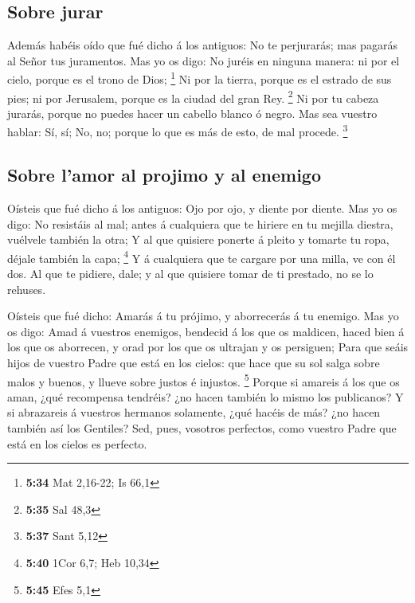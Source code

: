 \hypertarget{sobre-jurar}{%
\subsection{Sobre jurar}\label{sobre-jurar}}

 Además habéis oído que fué dicho á los antiguos: No te
perjurarás; mas pagarás al Señor tus juramentos.  Mas yo os
digo: No juréis en ninguna manera: ni por el cielo, porque es el trono
de Dios; \footnote{\textbf{5:34} Mat 2,16-22; Is 66,1}  Ni
por la tierra, porque es el estrado de sus pies; ni por Jerusalem,
porque es la ciudad del gran Rey. \footnote{\textbf{5:35} Sal 48,3}
 Ni por tu cabeza jurarás, porque no puedes hacer un
cabello blanco ó negro.  Mas sea vuestro hablar: Sí, sí;
No, no; porque lo que es más de esto, de mal procede. \footnote{\textbf{5:37}
  Sant 5,12}

\hypertarget{sobre-lamor-al-projimo-y-al-enemigo}{%
\subsection{Sobre l'amor al projimo y al
enemigo}\label{sobre-lamor-al-projimo-y-al-enemigo}}

 Oísteis que fué dicho á los antiguos: Ojo por ojo, y
diente por diente.  Mas yo os digo: No resistáis al mal;
antes á cualquiera que te hiriere en tu mejilla diestra, vuélvele
también la otra;  Y al que quisiere ponerte á pleito y
tomarte tu ropa, déjale también la capa; \footnote{\textbf{5:40} 1Cor
  6,7; Heb 10,34}  Y á cualquiera que te cargare por una
milla, ve con él dos.  Al que te pidiere, dale; y al que
quisiere tomar de ti prestado, no se lo rehuses.

 Oísteis que fué dicho: Amarás á tu prójimo, y aborrecerás
á tu enemigo.  Mas yo os digo: Amad á vuestros enemigos,
bendecid á los que os maldicen, haced bien á los que os aborrecen, y
orad por los que os ultrajan y os persiguen;  Para que
seáis hijos de vuestro Padre que está en los cielos: que hace que su sol
salga sobre malos y buenos, y llueve sobre justos é injustos.
\footnote{\textbf{5:45} Efes 5,1}  Porque si amareis á los
que os aman, ¿qué recompensa tendréis? ¿no hacen también lo mismo los
publicanos?  Y si abrazareis á vuestros hermanos solamente,
¿qué hacéis de más? ¿no hacen también así los Gentiles? 
Sed, pues, vosotros perfectos, como vuestro Padre que está en los cielos
es perfecto.

